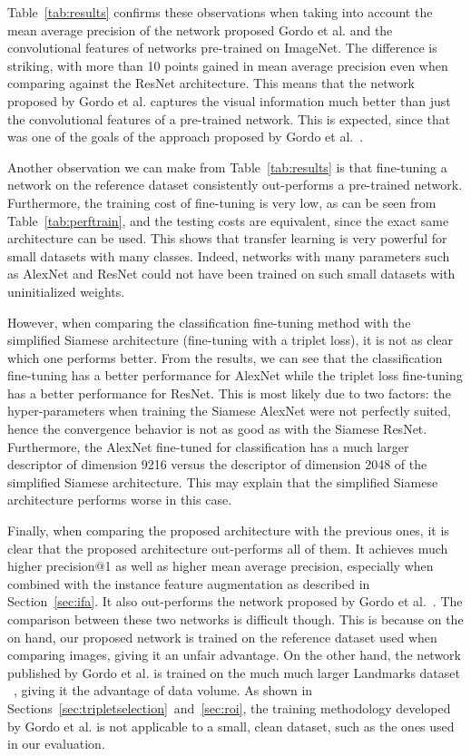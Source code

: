 Table~\ref{tab:results} confirms these observations when taking into
account the mean average precision of the network proposed Gordo et al.
and the convolutional features of networks pre-trained on ImageNet.
The difference is striking, with more than 10 points gained in mean
average precision even when comparing against the ResNet architecture.
This means that the network proposed by Gordo et al. captures the
visual information much better than just the convolutional features
of a pre-trained network. This is expected, since that was one of the
goals of the approach proposed by Gordo et al.~\cite{gordo_deep_2016}.

Another observation we can make from Table~\ref{tab:results} is that
fine-tuning a network on the reference dataset consistently out-performs
a pre-trained network. Furthermore, the training cost of fine-tuning is
very low, as can be seen from Table~\ref{tab:perftrain}, and the testing
costs are equivalent, since the exact same architecture can be used.
This shows that transfer learning is very powerful for small datasets with
many classes. Indeed, networks with many parameters such as AlexNet and
ResNet could not have been trained on such small datasets with
uninitialized weights.

However, when comparing the classification fine-tuning method with the
simplified Siamese architecture (fine-tuning with a triplet loss),
it is not as clear which one performs better.
From the results, we can see that the classification fine-tuning has a better
performance for AlexNet while the triplet loss fine-tuning has a better
performance for ResNet. This is most likely due to two factors: the
hyper-parameters when training the Siamese AlexNet were not perfectly
suited, hence the convergence behavior is not as good as with the Siamese
ResNet. Furthermore, the AlexNet fine-tuned for classification has a much
larger descriptor of dimension 9216 versus the descriptor of dimension
2048 of the simplified Siamese architecture. This may explain that
the simplified Siamese architecture performs worse in this case.

Finally, when comparing the proposed architecture with the previous ones,
it is clear that the proposed architecture out-performs all of them.
It achieves much higher precision@1 as well as higher mean average precision,
especially when combined with the instance feature augmentation as described
in Section~\ref{sec:ifa}. It also out-performs the network proposed by
Gordo et al.~\cite{gordo_deep_2016}. The comparison between these two
networks is difficult though. This is because on the on hand, our proposed
network is trained on the reference dataset used when comparing images,
giving it an unfair advantage. On the other hand, the network published
by Gordo et al. is trained on the much much larger Landmarks dataset
~\cite{babenko_neural_2014}, giving it the advantage of data volume.
As shown in Sections~\ref{sec:tripletselection}~and~\ref{sec:roi},
the training methodology developed by Gordo et al. is not applicable
to a small, clean dataset, such as the ones used in our evaluation.
